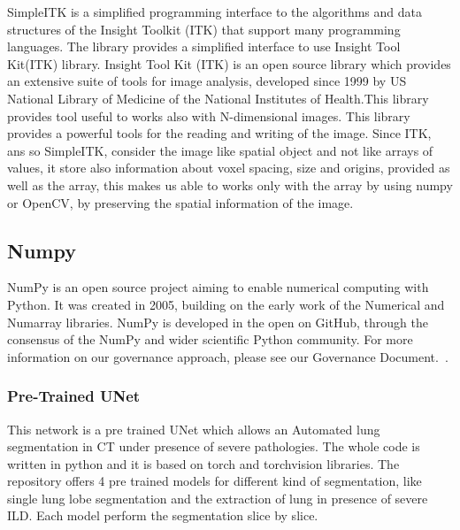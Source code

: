 \documentclass{standalone}
\begin{document}
	SimpleITK is a simplified programming interface to the algorithms and data structures of the Insight Toolkit (ITK) that support many programming languages. The library provides a simplified interface to use Insight Tool Kit(ITK) library. 
	Insight Tool Kit (ITK) is an open source library which provides an extensive suite of tools for image analysis, developed since 1999 by US National Library of Medicine of the National Institutes of Health.This library provides tool useful to works also with N-dimensional images. 
	This library provides a powerful tools for the reading and writing of the image. Since ITK, ans so SimpleITK,  consider the image like spatial object and not like arrays of values, it store also information about voxel spacing, size and origins, provided as well as the array, this makes us able to works only with the array by using numpy or OpenCV, by preserving the spatial information of the image.
	
	\subsection*{Numpy}
	
	NumPy is an open source project aiming to enable numerical computing with Python. It was created in 2005, building on the early work of the Numerical and Numarray libraries.	NumPy is developed in the open on GitHub, through the consensus of the NumPy and wider scientific Python community. For more information on our governance approach, please see our Governance Document.~\cite{Numpy}. 

	\subsubsection*{Pre-Trained UNet} 
	
	This network is a pre trained UNet which allows an Automated lung segmentation in CT under presence of severe pathologies. The whole code is written in python and it is based on torch and torchvision libraries. The repository offers 4 pre trained models for different kind of segmentation, like single lung lobe segmentation and the extraction of lung in presence of severe ILD. Each model perform the segmentation slice by slice. 
	
\end{document}
